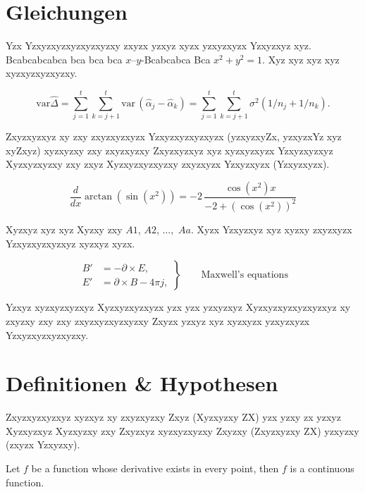 \section{Gleichungen}

Yzx Yzxyzxyzxyzxyzxyzxy zxyzx yzxyz xyzx yzxyzxyzx Yzxyzxyz xyz. Bcabcabcabca bca bca bca $x$--$y$-Bcabcabca Bca \( x^2 + y^2 = 1 \). Xyz xyz xyz xyz xyzxyzxyzxyzxy. 

\begin{equation}
\mbox{var}\widehat{\Delta} = \sum_{j = 1}^t \sum_{k = j+1}^t
\mbox{var}\,(\hat{\alpha}_j - \hat{\alpha}_k)  = \sum_{j = 1}^t
\sum_{k = j+1}^t \sigma^2(1/n_j + 1/n_k). \label{eq:delvart}
\end{equation}

Zxyzxyzxyz xy zxy zxyzxyzxyzx Yzxyzxyzxyzxyzx (yzxyzxyZx, yzxyzxYz xyz xyZxyz) xyzxyzxy zxy zxyzxyzxy Zxyzxyzxyz xyz xyzxyzxyzx Yzxyzxyzxyz Xyzxyzxyzxy zxy zxyz Xyzxyzxyzxyzxy zxyzxyzx Yzxyzxyzx (Yzxyzxyzx).

\[
{\frac {d}{dx}}\arctan(\sin({x}^{2}))=-2\,{\frac {\cos({x}^{2})x}{-2+
		\left (\cos({x}^{2})\right )^{2}}}
\]

Xyzxyz xyz xyz Xyzxy zxy $A1$, $A2$, $\ldots,$ $Aa$. Xyzx Yzxyzxyz xyz xyzxy zxyzxyzx Yzxyzxyzxyzxyz xyzxyz xyzx.

\begin{equation}
\left.\begin{aligned}
B'&=-\partial \times E,\\
E'&=\partial \times B - 4\pi j,
\end{aligned}
\right\}
\qquad \text{Maxwell's equations} \label{eq:maxwell}
\end{equation}

Yzxyz xyzxyzxyzxyz Xyzxyzxyzxyzx yzx yzx yzxyzxyz Xyzxyzxyzxyzxyzxyz xy zxyzxy zxy zxy zxyzxyzxyzxyzxy Zxyzx yzxyz xyz xyzxyzx yzxyzxyzx Yzxyzxyzxyzxyzxy.


\section{Definitionen \& Hypothesen}

Zxyzxyzxyzxyz xyzxyz xy zxyzxyzxy Zxyz (Xyzxyzxy ZX) yzx yzxy zx yzxyz Xyzxyzxyz Xyzxyzxy zxy Zxyzxyz xyzxyzxyzxy Zxyzxy (Zxyzxyzxy ZX) yzxyzxy (zxyzx Yzxyzxy).

\begin{definition}
	Let $f$ be a function whose derivative exists in every point, then $f$ is a continuous function.
\end{definition}

